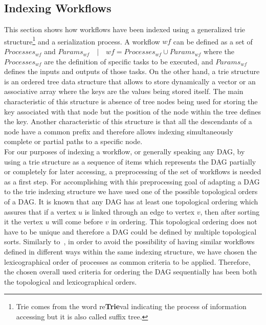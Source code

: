 \subsection{Indexing Workflows}
\label{sec:indexation}

This section shows how workflows have been indexed using a generalized trie structure\footnote{Trie comes from the word re{\bf Trie}val indicating the process of information accessing but it is also called suffix tree.} and a serialization process. 
A workflow $wf$ can be defined as a set of $Processes_{wf}$ and $Params_{wf} \quad | \quad wf = Processes_{wf} \cup Params_{wf}$ where the $Processes_{wf}$ are the definition of specific tasks to be executed, and $Params_{wf}$ defines the inputs and outputs of those tasks. On the other hand, a trie structure is an ordered tree data structure that allows to store dynamically a vector or an associative array where the keys are the values being stored itself. The main characteristic of this structure is absence of tree nodes being used for storing the key associated with that node but the position of the node within the tree defines the key. Another characteristic of this structure is that all the descendants of a node have a common prefix and therefore allows indexing simultaneously complete or partial paths to a specific node. \\

For our purposes of indexing a workflow, or generally speaking any DAG, by using a trie structure as a sequence of items which represents the DAG partially or completely for later accessing, a preprocessing of the set of workflows is needed as a first step. For accomplishing with this preprocessing goal of adapting a DAG to the trie indexing structure we have used one of the possible topological orders of a DAG. It is known that any DAG has at least one topological ordering which assures that if a vertex $u$ is linked through an edge to vertex $v$, then after sorting it the vertex $u$ will come before $v$ in ordering. This topological ordering does not have to be unique and therefore a DAG could be defined by multiple topological sorts. Similarly to~\cite{Matono03anindexing}, in order to avoid the possibility of having similar workflows defined in  different ways within the same indexing structure, we have chosen the lexicographical order of processes as common criteria to be applied. Therefore, the chosen overall used criteria for ordering the DAG sequentially has been both the topological and lexicographical orders. \\

